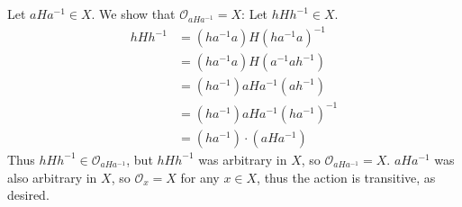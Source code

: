 \documentclass[11pt]{article}
\begin{document}
\section{} %
\subsection{} %
Let $aHa^{-1}\in X$. We show that $\mathcal O_{aHa^{-1}}=X$:
\newline
\newline
Let $hHh^{-1}\in X$.
\begin{align*}
	hHh^{-1}&=(ha^{-1}a)H(ha^{-1}a)^{-1}\\
	&=(ha^{-1}a)H(a^{-1}ah^{-1})\\
	&=(ha^{-1})aHa^{-1}(ah^{-1})\\
	&=(ha^{-1})aHa^{-1}(ha^{-1})^{-1}\\
	&=(ha^{-1})\cdot(aHa^{-1})
\end{align*}
Thus $hHh^{-1}\in\mathcal O_{aHa^{-1}}$, but $hHh^{-1}$ was arbitrary in $X$,
so $\mathcal O_{aHa^{-1}}=X$. $aHa^{-1}$ was also arbitrary in $X$, so
$\mathcal O_x=X$ for any $x\in X$, thus the action is transitive, as desired.
\end{document}
